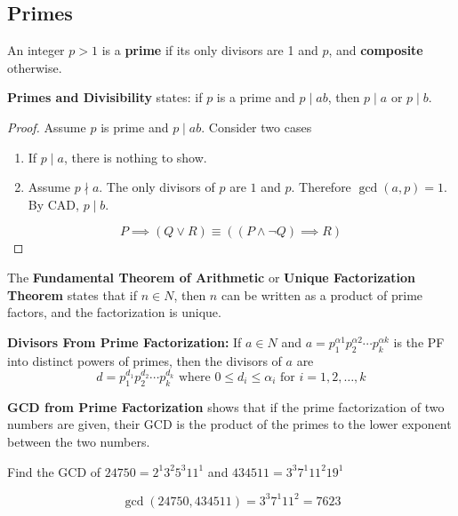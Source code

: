\documentclass[english, 12pt]{article}
\begin{document}
\subsection{Primes}
\begin{defn}
An integer $p>1$ is a \textbf{prime} if its only divisors are 1 and $p$, and \textbf{composite} otherwise.
\end{defn}
\begin{thrm}[PAD]
\textbf{Primes and Divisibility} states: if $p$ is a prime and $p \mid ab$, then $p \mid a$ or $p \mid b$.
\begin{proof}
Assume $p$ is prime and $p \mid ab$. Consider two cases
\begin{enumerate}
\item If $p \mid a$, there is nothing to show.
\item Assume $p \nmid a$. The only divisors of $p$ are $1$ and $p$. Therefore $\gcd(a,p) = 1$. By CAD, $p \mid b$.
\end{enumerate}
\[ P \implies (Q \lor R) \equiv ( (P \land \lnot Q) \implies R) \]
\end{proof}
\end{thrm}
\begin{thrm}[UFT]
The \textbf{Fundamental Theorem of Arithmetic} or \textbf{Unique Factorization Theorem} states that if $n \in N$, then $n$ can be written as a product of prime factors, and the factorization is unique.
\end{thrm}
\begin{thrm}[DFPF]
\textbf{Divisors From Prime Factorization:} If $a \in N$ and $a = p^{\alpha 1}_{1} p^{\alpha 2}_{2} \cdots p^{\alpha k}_{k}$ is the PF into distinct powers of primes, then the divisors of $a$ are
\[ d = p^{d_{1}}_{1} p^{d_{2}}_{2} \cdots p^{d_{k}}_{k} \text{ where } 0 \leq d_{i} \leq \alpha_{i} \text{ for } i = 1,2,\dots,k \]
\end{thrm}
\begin{thrm}[GCD PF]
\textbf{GCD from Prime Factorization} shows that if the prime factorization of two numbers are given, their GCD is the product of the primes to the lower exponent between the two numbers.
\end{thrm}
\begin{exmp}
Find the GCD of $24750 = 2^1 3^2 5^3 11^1$ and $434511 = 3^3 7^1 11^2 19^1$
\begin{sol}
\[\gcd(24750,434511) = 3^3 7^1 11^2 = 7623 \]
\end{sol}
\end{exmp}
\end{document}
